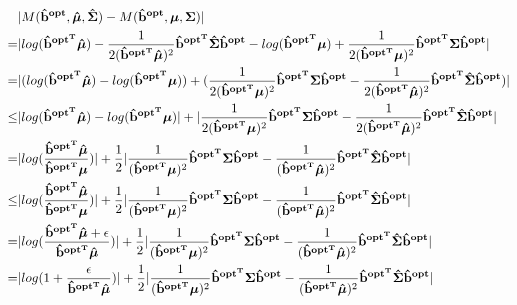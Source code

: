 \documentclass{gapd}
\begin{document}
\begin{equation}
\begin{aligned}
&|M(\mathbf{\hat{b}^{opt}},\boldsymbol{\hat{\mu}},\boldsymbol{\hat{\Sigma}})-M(\mathbf{\hat{b}^{opt}},\boldsymbol{\mu},\boldsymbol{\Sigma})|\\
=&|log(\mathbf{\hat{b}^{{opt}^T}}\boldsymbol{\hat{\mu}})-\frac{1}{2(\mathbf{\hat{b}^{{opt}^T}}\boldsymbol{\hat{\mu}})^2}\mathbf{\hat{b}^{{opt}^T}}\boldsymbol{\hat{\Sigma}}\mathbf{\hat{b}^{opt}}-log(\mathbf{\hat{b}^{{opt}^T}} \boldsymbol{\mu})+\frac{1}{2(\mathbf{\hat{b}^{{opt}^T}}\boldsymbol{\mu})^2}\mathbf{\hat{b}^{{opt}^T}}\boldsymbol{\Sigma}\mathbf{\hat{b}^{opt}}|\\
=&|(log(\mathbf{\hat{b}^{{opt}^T}}\boldsymbol{\hat{\mu}})-log(\mathbf{\hat{b}^{{opt}^T}} \boldsymbol{\mu}))+(\frac{1}{2(\mathbf{\hat{b}^{{opt}^T}}\boldsymbol{\mu})^2}\mathbf{\hat{b}^{{opt}^T}}\boldsymbol{\Sigma}\mathbf{\hat{b}^{opt}}-\frac{1}{2(\mathbf{\hat{b}^{{opt}^T}}\boldsymbol{\hat{\mu}})^2}\mathbf{\hat{b}^{{opt}^T}}\boldsymbol{\hat{\Sigma}}\mathbf{\hat{b}^{opt}})|\\
\le & |log(\mathbf{\hat{b}^{{opt}^T}}\boldsymbol{\hat{\mu}})-log(\mathbf{\hat{b}^{{opt}^T}} \boldsymbol{\mu})|+ |\frac{1}{2(\mathbf{\hat{b}^{{opt}^T}}\boldsymbol{\mu})^2}\mathbf{\hat{b}^{{opt}^T}}\boldsymbol{\Sigma}\mathbf{\hat{b}^{opt}}-\frac{1}{2(\mathbf{\hat{b}^{{opt}^T}}\boldsymbol{\hat{\mu}})^2}\mathbf{\hat{b}^{{opt}^T}}\boldsymbol{\hat{\Sigma}}\mathbf{\hat{b}^{opt}}|\\
=& |log(\frac{\mathbf{\hat{b}^{{opt}^T}}\boldsymbol{\hat{\mu}}}{\mathbf{\hat{b}^{{opt}^T}} \boldsymbol{\mu}})|+ \frac{1}{2}|\frac{1}{(\mathbf{\hat{b}^{{opt}^T}}\boldsymbol{\mu})^2}\mathbf{\hat{b}^{{opt}^T}}\boldsymbol{\Sigma}\mathbf{\hat{b}^{opt}}-\frac{1}{(\mathbf{\hat{b}^{{opt}^T}}\boldsymbol{\hat{\mu}})^2}\mathbf{\hat{b}^{{opt}^T}}\boldsymbol{\hat{\Sigma}}\mathbf{\hat{b}^{opt}}|\\
\le& |log(\frac{\mathbf{\hat{b}^{{opt}^T}}\boldsymbol{\hat{\mu}}}{\mathbf{\hat{b}^{{opt}^T}} \boldsymbol{\mu}})|+ \frac{1}{2}|\frac{1}{(\mathbf{\hat{b}^{{opt}^T}}\boldsymbol{\mu})^2}\mathbf{\hat{b}^{{opt}^T}}\boldsymbol{\Sigma}\mathbf{\hat{b}^{opt}}-\frac{1}{(\mathbf{\hat{b}^{{opt}^T}}\boldsymbol{\hat{\mu}})^2}\mathbf{\hat{b}^{{opt}^T}}\boldsymbol{\hat{\Sigma}}\mathbf{\hat{b}^{opt}}|\\
=&|log(\frac{\mathbf{\hat{b}^{{opt}^T}}\boldsymbol{\hat{\mu}}+\epsilon}{\mathbf{\hat{b}^{{opt}^T}} \boldsymbol{\hat{\mu}}})|+ \frac{1}{2}|\frac{1}{(\mathbf{\hat{b}^{{opt}^T}}\boldsymbol{\mu})^2}\mathbf{\hat{b}^{{opt}^T}}\boldsymbol{\Sigma}\mathbf{\hat{b}^{opt}}-\frac{1}{(\mathbf{\hat{b}^{{opt}^T}}\boldsymbol{\hat{\mu}})^2}\mathbf{\hat{b}^{{opt}^T}}\boldsymbol{\hat{\Sigma}}\mathbf{\hat{b}^{opt}}|\\
=& |log(1+\frac{\epsilon}{\mathbf{\hat{b}^{{opt}^T}} \boldsymbol{\hat{\mu}}})|+ \frac{1}{2}|\frac{1}{(\mathbf{\hat{b}^{{opt}^T}}\boldsymbol{\mu})^2}\mathbf{\hat{b}^{{opt}^T}}\boldsymbol{\Sigma}\mathbf{\hat{b}^{opt}}-\frac{1}{(\mathbf{\hat{b}^{{opt}^T}}\boldsymbol{\hat{\mu}})^2}\mathbf{\hat{b}^{{opt}^T}}\boldsymbol{\hat{\Sigma}}\mathbf{\hat{b}^{opt}}|
\end{aligned}\notag
\end{equation}
\end{document}

